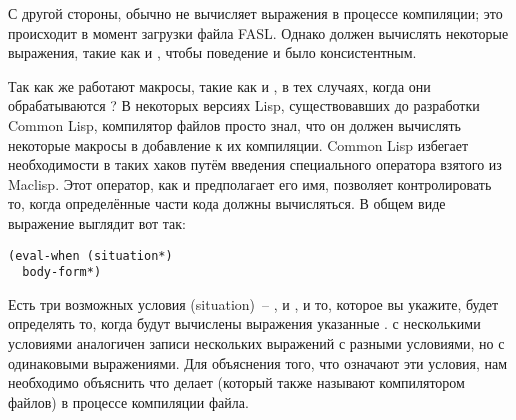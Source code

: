С другой стороны,  обычно не вычисляет выражения в процессе компиляции;
это происходит в момент загрузки файла FASL. Однако  должен вычислять
некоторые выражения, такие как  и , чтобы поведение
 и  было консистентным.

Так как же работают макросы, такие как  и , в тех случаях,
когда они обрабатываются ?  В некоторых версиях Lisp, существовавших до
разработки Common Lisp, компилятор файлов просто знал, что он должен вычислять некоторые
макросы в добавление к их компиляции.  Common Lisp избегает необходимости в таких хаков
путём введения специального оператора  взятого из Maclisp.  Этот оператор,
как и предполагает его имя, позволяет контролировать то, когда определённые части кода
должны вычисляться. В общем виде выражение  выглядит вот так:

\begin{lstlisting}
(eval-when (situation*)
  body-form*)
\end{lstlisting}

Есть три возможных условия (situation)~-- , 
и , и то, которое вы укажите, будет определять то, когда будут вычислены
выражения указанные .   с несколькими условиями
аналогичен записи нескольких выражений  с разными условиями, но с
одинаковыми выражениями.  Для объяснения того, что означают эти условия, нам необходимо
объяснить что делает  (который также называют компилятором файлов) в
процессе компиляции файла.


